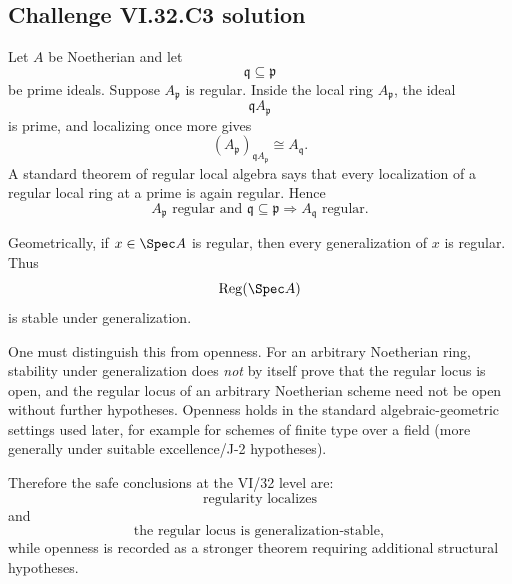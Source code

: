 \subsection*{Challenge VI.32.C3 solution}
\begin{solution}
Let \(A\) be Noetherian and let
\[
\mathfrak q\subseteq\mathfrak p
\]
be prime ideals.  Suppose \(A_{\mathfrak p}\) is regular.  Inside the local ring \(A_{\mathfrak p}\), the ideal
\[
\mathfrak qA_{\mathfrak p}
\]
is prime, and localizing once more gives
\[
(A_{\mathfrak p})_{\mathfrak qA_{\mathfrak p}}
\cong
A_{\mathfrak q}.
\]
A standard theorem of regular local algebra says that every localization of a regular local ring at a prime is
again regular. Hence
\[
\boxed{
A_{\mathfrak p}\text{ regular and }\mathfrak q\subseteq\mathfrak p
\Longrightarrow
A_{\mathfrak q}\text{ regular}.
}
\]

Geometrically, if \(x\in\Spec A\) is regular, then every generalization of \(x\) is regular. Thus
\[
\operatorname{Reg}(\Spec A)
\]
is stable under generalization.

One must distinguish this from openness.  For an arbitrary Noetherian ring, stability under generalization does
\emph{not} by itself prove that the regular locus is open, and the regular locus of an arbitrary Noetherian scheme
need not be open without further hypotheses.  Openness holds in the standard algebraic-geometric settings used
later, for example for schemes of finite type over a field (more generally under suitable excellence/J-2
hypotheses).

Therefore the safe conclusions at the VI/32 level are:
\[
\boxed{\text{regularity localizes}}
\]
and
\[
\boxed{\text{the regular locus is generalization-stable}},
\]
while openness is recorded as a stronger theorem requiring additional structural hypotheses.
\end{solution}

